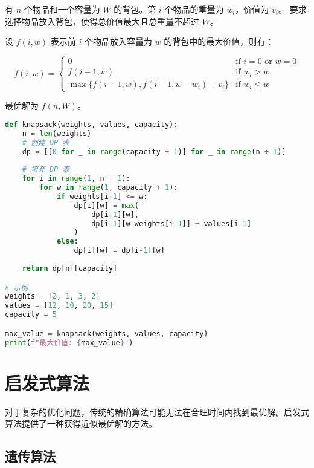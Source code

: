 \begin{example}[背包问题]\label{ex:knapsack}
有 $n$ 个物品和一个容量为 $W$ 的背包。第 $i$ 个物品的重量为 $w_i$，价值为 $v_i$。
要求选择物品放入背包，使得总价值最大且总重量不超过 $W$。
\end{example}

\begin{examplebox}[title=0-1 背包问题的动态规划解法]
设 $f(i, w)$ 表示前 $i$ 个物品放入容量为 $w$ 的背包中的最大价值，则有：

\[
f(i, w) = \begin{cases}
0 & \text{if } i = 0 \text{ or } w = 0 \\
f(i-1, w) & \text{if } w_i > w \\
\max\{f(i-1, w), f(i-1, w-w_i) + v_i\} & \text{if } w_i \leq w
\end{cases}
\]

最优解为 $f(n, W)$。
\end{examplebox}

\begin{codebox}[title=背包问题的 Python 实现]
\begin{lstlisting}[language=Python]
def knapsack(weights, values, capacity):
    n = len(weights)
    # 创建 DP 表
    dp = [[0 for _ in range(capacity + 1)] for _ in range(n + 1)]
    
    # 填充 DP 表
    for i in range(1, n + 1):
        for w in range(1, capacity + 1):
            if weights[i-1] <= w:
                dp[i][w] = max(
                    dp[i-1][w],
                    dp[i-1][w-weights[i-1]] + values[i-1]
                )
            else:
                dp[i][w] = dp[i-1][w]
    
    return dp[n][capacity]

# 示例
weights = [2, 1, 3, 2]
values = [12, 10, 20, 15]
capacity = 5

max_value = knapsack(weights, values, capacity)
print(f"最大价值: {max_value}")
\end{lstlisting}
\end{codebox}

\section{启发式算法}\label{sec:heuristic-algorithms}

对于复杂的优化问题，传统的精确算法可能无法在合理时间内找到最优解。启发式算法提供了一种获得近似最优解的方法。

\subsection{遗传算法}

